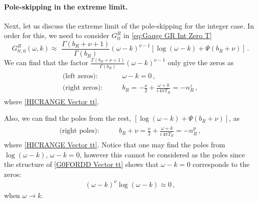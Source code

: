 \documentclass[11pt,a4paper]{article}
\begin{document}
\paragraph{Pole-skipping in the extreme limit.}
Next, let us discuss the extreme limit of the pole-skipping for the integer case.
In order for this, we need to consider $G^R_{tt}$ in \eqref{eq:Gauge GR Int Zero T}
\begin{equation}\label{G0FORDD Vector tt}
    G^R_{tt,0} (\omega, k)  \approx \,\, \frac{\Gamma({b}_R+\nu+1)}{\Gamma({b}_R)} \left( \omega-k \right)^{\nu-1} \left[ \log (\omega-k) +\Psi\left({b}_R+\nu\right) \right]\,.
\end{equation}
We can find that the factor $\frac{\Gamma({b}_R+\nu+1)}{\Gamma({b}_R)} \left( \omega-k \right)^{\nu-1}$ only give the zeros as
\begin{align}\label{ZEL Vector tt}
\begin{split}
    \text{(left zeros):} \qquad & \omega - k = 0\,,\\
    \text{(right zeros):} \qquad & {b}_R = -\frac{\nu}{2} +\frac{\omega+k}{ i\, 4 \pi T_R} = - n^z_R\,,
\end{split}
\end{align}
where \eqref{HICRANGE Vector tt}.

Also, we can find the poles from the rest, $\left[ \log (\omega-k) +\Psi\left({b}_R+\nu\right) \right]$, as
\begin{align}\label{PEL Vector tt}
\begin{split}
    \text{(right poles):} \qquad & {b}_R+\nu = \frac{\nu}{2} + \frac{\omega+k}{i\, 4 \pi T_R} = - n^p_R\,,
\end{split}
\end{align}
where \eqref{HICRANGE Vector tt}. Notice that one may find the poles from $\log (\omega-k)$, $\omega-k=0$, however this cannot be considered as the poles since the structure of \eqref{G0FORDD Vector tt} shows that $\omega-k=0$ corresponds to the zeros: 
\begin{equation}\label{}
\begin{split}
\left( \omega-k \right)^{\nu}\log (\omega-k) \approx 0  \,,
\end{split}
\end{equation}
when $\omega \rightarrow k$.\\
\end{document}
